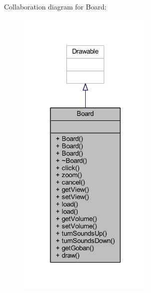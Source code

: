 Collaboration diagram for Board\+:
\nopagebreak
\begin{figure}[H]
\begin{center}
\leavevmode
\includegraphics[width=185pt]{class_board__coll__graph}
\end{center}
\end{figure}
